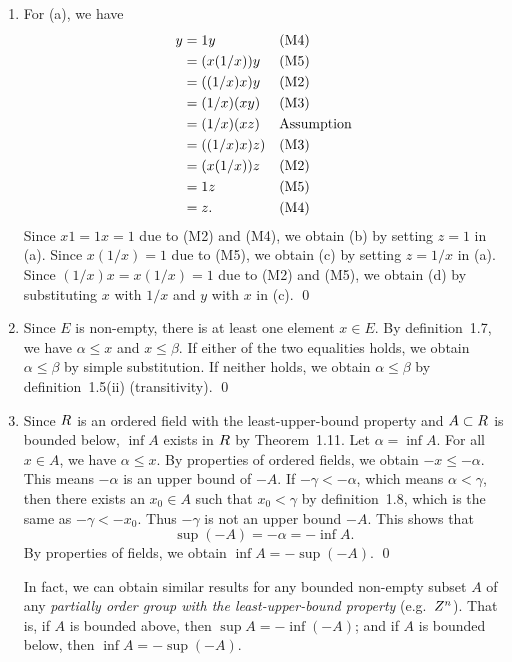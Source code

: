 \begin{enumerate}
\item For (a), we have
  \begin{align*}
    y
    &= 1y
    && \text{(M4)} \\
    &= (x(1/x))y
    && \text{(M5)} \\
    &= ((1/x)x)y
    && \text{(M2)} \\
    &= (1/x)(xy)
    && \text{(M3)} \\
    &= (1/x)(xz)
    && \text{Assumption} \\
    &= ((1/x)x)z)
    && \text{(M3)} \\
    &= (x(1/x))z
    && \text{(M2)} \\
    &= 1z
    && \text{(M5)} \\
    &= z.
    && \text{(M4)}
  \end{align*}
  Since \(x1 = 1x = 1\) due to (M2) and (M4), we obtain (b) by setting \(z = 1\) in (a).  Since \(x(1/x) = 1\) due to (M5), we obtain (c) by setting \(z = 1/x\) in (a).  Since \((1/x)x = x(1/x) = 1\) due to (M2) and (M5), we obtain (d) by substituting \(x\) with \(1/x\) and \(y\) with \(x\) in (c).
  \qed

\item Since \(E\) is non-empty, there is at least one element \(x \in E\).  By definition~1.7, we have \(α \le x\) and \(x \le β\).  If either of the two equalities holds, we obtain \(α \le β\) by simple substitution.  If neither holds, we obtain \(α \le β\) by definition~1.5(ii) (transitivity).
  \qed

\item Since \(R\) is an ordered field with the least-upper-bound property and \(A \subset R\) is bounded below, \(\inf A\) exists in \(R\) by Theorem~1.11.  Let \(α = \inf A\).  For all \(x \in A\), we have \(α \le x\).  By properties of ordered fields, we obtain \(-x \le -α\).  This means \(-α\) is an upper bound of \(-A\).  If \(-γ < -α\), which means \(α < γ\), then there exists an \(x_0 \in A\) such that \(x_0 < γ\) by definition~1.8, which is the same as \(-γ < -x_0\).  Thus \(-γ\) is not an upper bound \(-A\).  This shows that
  \begin{equation*}
    \sup(-A) = -α = -\inf A.
  \end{equation*}
  By properties of fields, we obtain \(\inf A = -\sup(-A)\).
  \qed

  In fact, we can obtain similar results for any bounded non-empty subset \(A\) of any \emph{partially order group with the least-upper-bound property} (e.g.\ \(Z^n\)).  That is, if \(A\) is bounded above, then \(\sup A = -\inf(-A)\); and if \(A\) is bounded below, then \(\inf A = -\sup(-A)\).


\end{enumerate}
